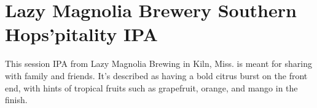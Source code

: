 \documentclass[10pt,oneside]{scrbook}
\begin{document}
\pagebreak

\begin{ingredientsblock}

\begin{malts}
\end{malts}

\begin{hops}
\end{hops}

\begin{yeasts}
\end{yeasts}

\end{ingredientsblock}

\chapter*{Lazy Magnolia Brewery Southern Hops'pitality IPA}

\begin{aboutblock}
This session IPA from Lazy Magnolia Brewing in Kiln, Miss. is meant for sharing with
family and friends. It's described as having a bold citrus burst on the front end, with
hints of tropical fruits such as grapefruit, orange, and mango in the finish.
\end{aboutblock}

\end{document}
